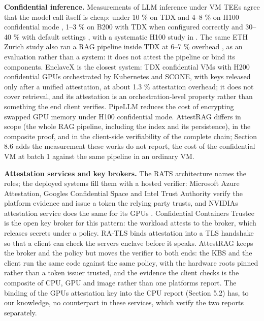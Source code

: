 \documentclass[letterpaper,twocolumn,10pt]{article}
\begin{document}
\textbf{Confidential inference.} Measurements of LLM inference under VM TEEs agree that the model call itself is cheap: under 10 \% on TDX and 4--8 \% on H100 confidential mode \cite{chrapek2025confidential}, 1--3 \% on B200 with TDX when configured correctly and 30--40 \% with default settings \cite{asad2026blackwell}, with a systematic H100 study in \cite{ibarra2025ccgpu}. The same ETH Zurich study also ran a RAG pipeline inside TDX at 6--7 \% overhead \cite{chrapek2025confidential}, as an evaluation rather than a system: it does not attest the pipeline or bind its components. EnclaveX \cite{schambach2026enclavex} is the closest system: TDX confidential VMs with H200 confidential GPUs orchestrated by Kubernetes and SCONE, with keys released only after a unified attestation, at about 1.3 \% attestation overhead; it does not cover retrieval, and its attestation is an orchestration-level property rather than something the end client verifies. PipeLLM \cite{tan2025pipellm} reduces the cost of encrypting swapped GPU memory under H100 confidential mode. AttestRAG differs in scope (the whole RAG pipeline, including the index and its persistence), in the composite proof, and in the client-side verifiability of the complete chain; Section 8.6 adds the measurement these works do not report, the cost of the confidential VM at batch 1 against the same pipeline in an ordinary VM.

\textbf{Attestation services and key brokers.} The RATS architecture \cite{rfc9334} names the roles; the deployed systems fill them with a hosted verifier: Microsoft Azure Attestation, Google\textquotesingle s Confidential Space \cite{gcp2026confidentialspace} and Intel Trust Authority verify the platform evidence and issue a token the relying party trusts, and NVIDIA\textquotesingle s attestation service does the same for its GPUs \cite{nvidia2024cc}. Confidential Containers\textquotesingle{} Trustee \cite{trustee} is the open key broker for this pattern: the workload attests to the broker, which releases secrets under a policy. RA-TLS \cite{knauth2018ratls} binds attestation into a TLS handshake so that a client can check the server\textquotesingle s enclave before it speaks. AttestRAG keeps the broker and the policy but moves the verifier to both ends: the KBS and the client run the same code against the same policy, with the hardware roots pinned rather than a token issuer trusted, and the evidence the client checks is the composite of CPU, GPU and image rather than one platform\textquotesingle s report. The binding of the GPU\textquotesingle s attestation key into the CPU report (Section 5.2) has, to our knowledge, no counterpart in these services, which verify the two reports separately.
\end{document}
